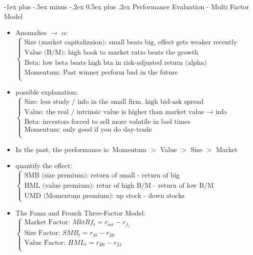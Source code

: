 \documentclass[10pt,landscape]{article}
\makeatletter
\renewcommand{\section}{\@startsection{section}{1}{0mm}%
                                {-1ex plus -.5ex minus -.2ex}%
                                {0.5ex plus .2ex}%
                                {\normalfont\large\bfseries}}
\makeatother
\begin{document}
\begin{multicols}{2}
    \section{Performance Evaluation - Multi Factor Model}
    \begin{itemize}
        \item Anomalies $\rightarrow$ $\alpha$:
            $
            \begin{cases}
                \text{Size (market capitalizaion): small beats big, effect gets weaker recently}\\
                \text{Value (B/M): high book to market ratio beats the growth}\\
                \text{Beta: low beta beats high bta in risk-adjusted return (alpha)}\\
                \text{Momentum: Past winner perform bad in the future}\\
            \end{cases}
            $
        \item possible explanation:
            $
            \begin{cases}
                \text{Size: less study / info in the small firm, high bid-ask spread}\\
                \text{Value: the real / intrinsic value is higher than market value $\rightarrow$ info}\\
                \text{Beta: investors forced to sell more volatile in bad times}\\
                \text{Momentum: only good if you do day-trade}\\
            \end{cases}
            $
        \item In the past, the performance is: Momentum $>$ Value $>$ Size $>$ Market
        \item quantify the effect:
            $
            \begin{cases}
                \text{SMB (size premium): return of small - return of big}\\
                \text{HML (value premium): retur of high B/M - return of low B/M}\\
                \text{UMD (Momentum premium): up stock - down stocks}
            \end{cases}
            $
        \item {\color{blue}The Fama and French Three-Factor Model}:
            $
            \begin{cases}
                \text{Market Factor: }M k t R f_{t}=r_{m t}-r_{f_{f}}\\
                \text{Size Factor: }S M B_{t}=r_{S t}-r_{B t}\\
                \text{Value Factor: }H M L_{t}=r_{H t}-r_{L t}\\
            \end{cases}
            $\\


\end{itemize}
\end{multicols}
\end{document}
